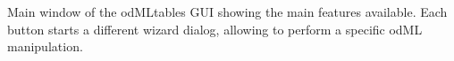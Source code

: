 \label{GUI_mainwindow}
Main window of the odMLtables GUI showing the main features available. Each button starts a different wizard dialog, allowing to perform a specific odML manipulation.
